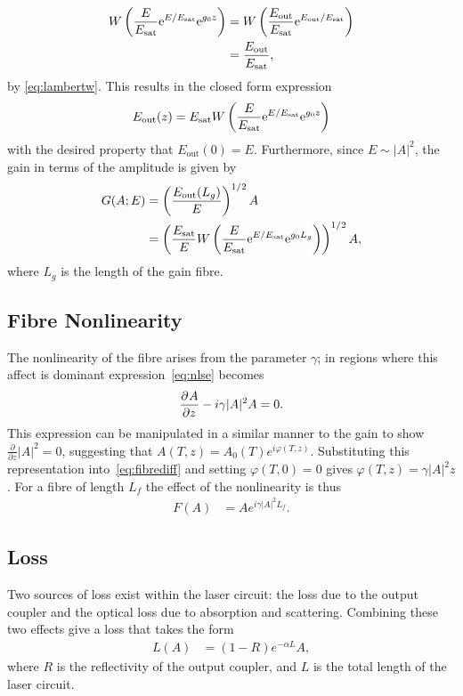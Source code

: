 \begin{align*}
W\left(\frac{E}{E_{\textrm{sat}}} \textrm{e}^{E/E_{\textrm{sat}}} \textrm{e}^{g_0 z}\right) &= W\left(\frac{E_{\textrm{out}}}{E_{\textrm{sat}}} \textrm{e}^{E_{\textrm{out}}/E_{\textrm{sat}}}\right) \\
&= \frac{E_{\textrm{out}}}{E_{\textrm{sat}}},
\end{align*}
by \eqref{eq:lambertw}. This results in the closed form expression
\begin{align*}
E_{\textrm{out}}(z) = E_{\textrm{sat}} W \left( \frac{E}{E_{\textrm{sat}}} \textrm{e}^{E/E_{\textrm{sat}}} \textrm{e}^{g_0 z} \right)
\end{align*}
with the desired property that $E_{\textrm{out}}(0)=E$. Furthermore, since $E \sim |A|^2$, the gain in terms of the amplitude is given by
\begin{align*}
G(A;E) &= \left(\frac{E_{\textrm{out}}(L_g)}{E}\right)^{1/2}A \\
&= \left( \frac{E_{\textrm{sat}}}{E} W \left( \frac{E}{E_{\textrm{sat}}} \textrm{e}^{E/E_{\textrm{sat}}} \textrm{e}^{g_0 L_g} \right) \right)^{1/2} A,
\end{align*}
where $L_g$ is the length of the gain fibre.

\subsection{Fibre Nonlinearity}
The nonlinearity of the fibre arises from the parameter $\gamma$; in regions where this affect is dominant expression~\eqref{eq:nlse} becomes
\begin{align}
\label{eq:fibrediff}
	\frac{\partial^{}A}{\partial{z}^{}} - i \gamma |A|^2 A = 0.
\end{align}
This expression can be manipulated in a similar manner to the gain to show $\frac{\partial}{\partial z} |A|^2 = 0$, suggesting that $A(T,z) = A_0(T) e^{i \varphi(T,z)}$. Substituting this representation into~\eqref{eq:fibrediff} and setting $\varphi(T,0)=0$ gives $\varphi(T,z) = \gamma |A|^2 z$. For a fibre of length $L_f$ the effect of the nonlinearity is thus
\begin{align*}
F(A) &= A e^{i \gamma |A|^2 L_f}.
\end{align*}

\subsection{Loss}
Two sources of loss exist within the laser circuit: the loss due to the output coupler and the optical loss due to absorption and scattering. Combining these two effects give a loss that takes the form
\begin{align*}
L(A) &= (1 - R) e^{- \alpha L}A,
\end{align*}
where $R$ is the reflectivity of the output coupler, and $L$ is the total length of the laser circuit.

